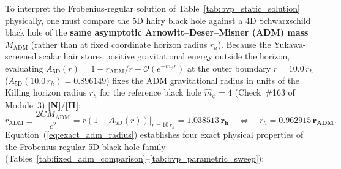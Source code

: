 \documentclass[11pt,a4paper]{article}
\newcommand{\catH}{\textbf{\textcolor{orange!85!black}{[H]}}}
\newcommand{\catN}{\textbf{\textcolor{teal!75!black}{[N]}}}
\theoremstyle{definition}
\theoremstyle{remark}
\begin{document}
To interpret the Frobenius-regular solution of Table~\ref{tab:bvp_static_solution} physically, one must compare the 5D hairy black hole against a 4D Schwarzschild black hole of the \textbf{same asymptotic Arnowitt--Deser--Misner (ADM) mass $M_{\text{ADM}}$} (rather than at fixed coordinate horizon radius $r_h$). Because the Yukawa-screened scalar hair stores positive gravitational energy outside the horizon, evaluating $A_{\text{5D}}(r) = 1 - r_{\text{ADM}}/r + \mathcal{O}(e^{-m_{\psi}r})$ at the outer boundary $r = 10.0\,r_h$ ($A_{\text{5D}}(10.0\,r_h) = 0.896149$) fixes the ADM gravitational radius in units of the Killing horizon radius $r_h$ for the reference black hole $\hat{m}_{\psi} = 4$ (Check~\#163 of Module~3) \catN/\catH:
\begin{equation}
  r_{\text{ADM}} \equiv \frac{2 G M_{\text{ADM}}}{c^2} = r\left(1 - A_{\text{5D}}(r)\right)\Big|_{r = 10\,r_h} = \mathbf{1.038513\,r_h} \quad \Longleftrightarrow \quad r_h = \mathbf{0.962915\,r_{\text{ADM}}}.
  \label{eq:exact_adm_radius}
\end{equation}
Equation~(\ref{eq:exact_adm_radius}) establishes four exact physical properties of the Frobenius-regular 5D black hole family (Tables~\ref{tab:fixed_adm_comparison}--\ref{tab:bvp_parametric_sweep}):
\end{document}
